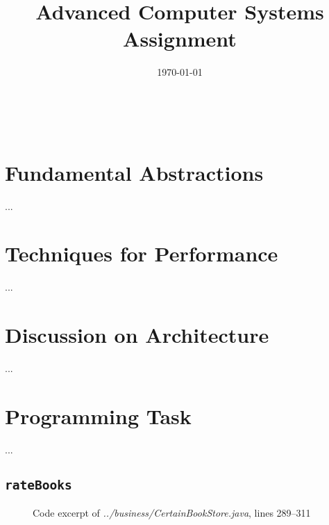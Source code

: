 \documentclass[10pt,a4paper]{article}
\title
{
    Advanced Computer Systems \\
    {\Large Assignment \assignmentnumber}
}
\author
{
    \authform{Hans J. T. Stephensen}{xkv467}
    \and
    \authform{Casper B. Hansen}{fvx507}
}
\date{\today}
\newcommand{\srcroot}{../src/com/acertainbookstore/}
\newcommand{\theabstract}
{
    \lipsum[1-1]
}
\newcommand{\colbreak}{{\ }\vfill\columnbreak}
\newcommand{\codeexcerpt}[3]
{
\begin{figure}[H]

\caption{Code excerpt of {\it ../#1}, lines #2--#3}
\end{figure}
}
\begin{document}
\clearpage
\maketitle
\thispagestyle{empty}

\setlength{\columnsep}{0pt}
\begin{multicols}{2}
    \abstract{\theabstract}
    \colbreak
    \tableofcontents
\end{multicols}
\setlength{\columnsep}{10pt}
\clearpage



\section{Fundamental Abstractions}
...



\section{Techniques for Performance}
...



\section{Discussion on Architecture}
...



\section{Programming Task}
...

\subsection{\tt rateBooks}
\codeexcerpt{business/CertainBookStore.java}{289}{311}
\end{document}
